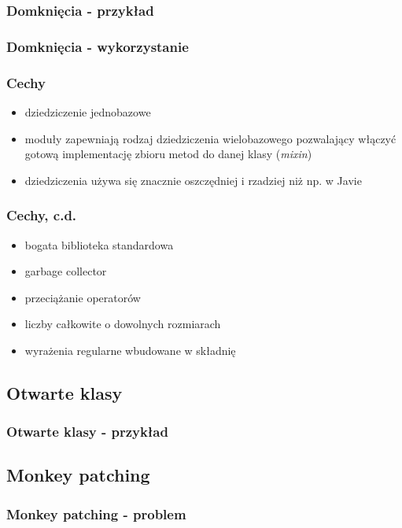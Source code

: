 \documentclass[12t]{beamer}
\begin{document}
\begin{frame}
  \frametitle{Domknięcia - przykład}
  
\end{frame}

\begin{frame}
  \frametitle{Domknięcia - wykorzystanie}
  
\end{frame}

\begin{frame}
  \frametitle{Cechy}
  \begin{itemize}
  \item dziedziczenie jednobazowe
  \item moduły zapewniają rodzaj dziedziczenia wielobazowego
    pozwalający włączyć gotową implementację zbioru metod do danej
    klasy (\emph{mixin})
  \item dziedziczenia używa się znacznie oszczędniej i rzadziej niż
    np. w Javie
  \end{itemize}
\end{frame}

\begin{frame}
  \frametitle{Cechy, c.d.}
  \begin{itemize}
  \item bogata biblioteka standardowa
  \item garbage collector
  \item przeciążanie operatorów
  \item liczby całkowite o dowolnych rozmiarach
  \item wyrażenia regularne wbudowane w składnię
  \end{itemize}
\end{frame}

\subsection{Otwarte klasy}
\begin{frame}
  \frametitle{Otwarte klasy - przykład}
  
\end{frame}

\subsection{Monkey patching}
\begin{frame}
  \frametitle{Monkey patching - problem}
  
\end{frame}
\end{document}
